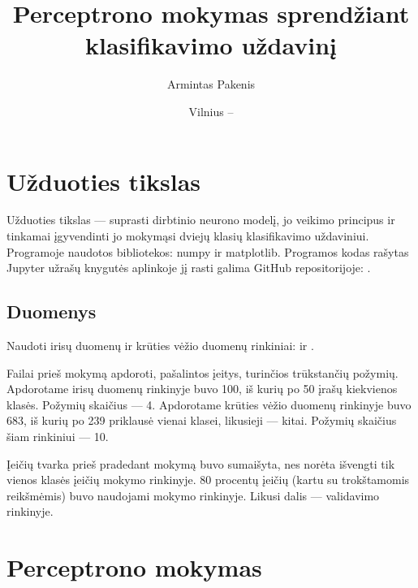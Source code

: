 \documentclass{VUMIFPSbakalaurinis}
\institute{Informatikos institutas}  %
\title{Perceptrono mokymas sprendžiant klasifikavimo uždavinį}
\author{Armintas Pakenis}
\date{Vilnius – \the\year}
\begin{document}
\maketitle


\tableofcontents

\section{Užduoties tikslas}
Užduoties tikslas — suprasti dirbtinio neurono modelį, 
jo veikimo principus ir tinkamai įgyvendinti jo mokymąsi dviejų klasių klasifikavimo uždaviniui.
Programoje naudotos bibliotekos: numpy ir matplotlib. Programos kodas rašytas Jupyter užrašų knygutės aplinkoje jį rasti galima GitHub repositorijoje: 
\href{https://github.com/ArmintasP/Computational-intelligence/tree/main/Lab2}{\color{cyan}{https://github.com/ArmintasP/Computational-intelligence/tree/main/Lab2}}.

\subsection{Duomenys}
Naudoti irisų duomenų ir krūties vėžio duomenų rinkiniai: 
\href{https://archive.ics.uci.edu/ml/datasets/iris}{\color{cyan}{https://archive.ics.uci.edu/ml/datasets/iris}}
ir
\href{https://archive.ics.uci.edu/ml/datasets/Breast+Cancer+Wisconsin+(Diagnostic)}{\color{cyan}{https://archive.ics.uci.edu/ml/datasets/Breast+Cancer+Wisconsin+(Diagnostic)}}.

Failai prieš mokymą apdoroti, pašalintos įeitys, turinčios trūkstančių požymių. 
Apdorotame irisų duomenų rinkinyje buvo 100, iš kurių po 50 įrašų kiekvienos klasės. Požymių skaičius — 4. 
Apdorotame krūties vėžio duomenų rinkinyje buvo 683, iš kurių po 239 priklausė vienai klasei, likusieji — kitai.
Požymių skaičius šiam rinkiniui — 10.

Įeičių tvarka prieš pradedant mokymą buvo sumaišyta, nes norėta išvengti tik vienos klasės įeičių mokymo rinkinyje.
80 procentų įeičių (kartu su trokštamomis reikšmėmis) buvo naudojami mokymo rinkinyje. Likusi dalis — validavimo rinkinyje.

\section{Perceptrono mokymas}
\end{document}
